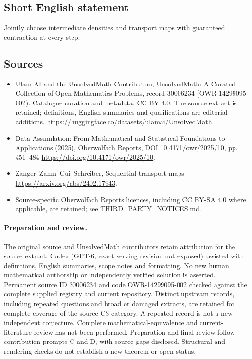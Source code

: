 \documentclass[11pt]{article}
\begin{document}
\subsection{Short English statement}
Jointly choose intermediate densities and transport maps with guaranteed contraction at every step.
\subsection{Sources}
\begin{itemize}
\item[\hypertarget{source:30006234:1}{S1}] Ulam AI and the UnsolvedMath Contributors, UnsolvedMath: A Curated Collection of Open Mathematics Problems, record 30006234 (OWR-14299095-002). Catalogue curation and metadata: CC BY 4.0. The source extract is retained; definitions, English summaries and qualifications are editorial additions.
\url{https://huggingface.co/datasets/ulamai/UnsolvedMath}.
\item[\hypertarget{source:30006234:2}{S2}] Data Assimilation: From Mathematical and Statistical Foundations to Applications (2025), Oberwolfach Reports, DOI 10.4171/owr/2025/10, pp. 451--484
\url{https://doi.org/10.4171/owr/2025/10}.
\item[\hypertarget{source:30006234:3}{S3}] Zanger--Zahm--Cui--Schreiber, Sequential transport maps
\url{https://arxiv.org/abs/2402.17943}.
\item Source-specific Oberwolfach Reports licences, including CC BY-SA 4.0 where applicable, are retained; see THIRD\_PARTY\_NOTICES.md.
\end{itemize}
\paragraph{Preparation and review.}
The original source and UnsolvedMath contributors retain attribution for the source extract. Codex (GPT-6; exact serving revision not exposed) assisted with definitions, English summaries, scope notes and formatting. No new human mathematical authorship or independently verified solution is asserted. Permanent source ID 30006234 and code OWR-14299095-002 checked against the complete supplied registry and current repository. Distinct upstream records, including repeated questions and broad or damaged extracts, are retained for complete coverage of the source CS category. A repeated record is not a new independent conjecture. Complete mathematical-equivalence and current-literature review has not been performed. Preparation and final review follow contribution prompts C and D, with source gaps disclosed. Structural and rendering checks do not establish a new theorem or open status.
\label{end:30006234}
\end{document}
